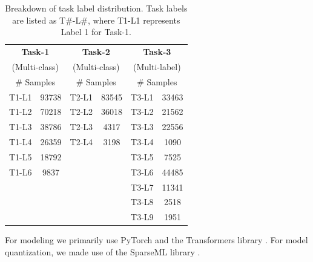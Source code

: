 \begin{table}[h]
    \centering
    \begin{center}
    \begin{tabular}{ l|ll|ll|l }
        \hline
        \multicolumn{2}{c}{\textbf{Task-1}} & \multicolumn{2}{||c||}{\textbf{Task-2}} & \multicolumn{2}{c}{\textbf{Task-3}} \\
        \multicolumn{2}{c}{(Multi-class)} & \multicolumn{2}{||c||}{(Multi-class)} & \multicolumn{2}{c}{(Multi-label)} \\
        \hline
        \multicolumn{2}{c}{\# Samples} & \multicolumn{2}{||c||}{\# Samples} & \multicolumn{2}{c}{\# Samples} \\
        \hline
        \multicolumn{1}{c}{T1-L1} & \multicolumn{1}{|c}{93738} & \multicolumn{1}{||c|}{T2-L1} & \multicolumn{1}{c||}{83545} & \multicolumn{1}{c|}{T3-L1} & \multicolumn{1}{c}{33463} \\
        \multicolumn{1}{c}{T1-L2} & \multicolumn{1}{|c}{70218} & \multicolumn{1}{||c|}{T2-L2} & \multicolumn{1}{c||}{36018} & \multicolumn{1}{c|}{T3-L2} & \multicolumn{1}{c}{21562} \\
        \multicolumn{1}{c}{T1-L3} & \multicolumn{1}{|c}{38786} & \multicolumn{1}{||c|}{T2-L3} & \multicolumn{1}{c||}{4317} & \multicolumn{1}{c|}{T3-L3} & \multicolumn{1}{c}{22556} \\
        \multicolumn{1}{c}{T1-L4} & \multicolumn{1}{|c}{26359} & \multicolumn{1}{||c|}{T2-L4} & \multicolumn{1}{c||}{3198} & \multicolumn{1}{c|}{T3-L4} & \multicolumn{1}{c}{1090} \\
        \multicolumn{1}{c}{T1-L5} & \multicolumn{1}{|c}{18792} & \multicolumn{1}{||c|}{} & \multicolumn{1}{c||}{} & \multicolumn{1}{c|}{T3-L5} & \multicolumn{1}{c}{7525} \\
        \multicolumn{1}{c}{T1-L6} & \multicolumn{1}{|c}{9837} & \multicolumn{1}{||c|}{} & \multicolumn{1}{c||}{} & \multicolumn{1}{c|}{T3-L6} & \multicolumn{1}{c}{44485} \\
        \multicolumn{1}{c}{} & \multicolumn{1}{|c}{} & \multicolumn{1}{||c|}{} & \multicolumn{1}{c||}{} & \multicolumn{1}{c|}{T3-L7} & \multicolumn{1}{c}{11341} \\
        \multicolumn{1}{c}{} & \multicolumn{1}{|c}{} & \multicolumn{1}{||c|}{} & \multicolumn{1}{c||}{} & \multicolumn{1}{c|}{T3-L8} & \multicolumn{1}{c}{2518} \\
        \multicolumn{1}{c}{} & \multicolumn{1}{|c}{} & \multicolumn{1}{||c|}{} & \multicolumn{1}{c||}{} & \multicolumn{1}{c|}{T3-L9} & \multicolumn{1}{c}{1951} \\
        \hline
    \end{tabular}
    \end{center}
    \caption{Breakdown of task label distribution. Task labels are listed as T\#-L\#, where T1-L1 represents Label 1 for Task-1.}
    \label{table_dataset_breakdown}
\end{table}
For modeling we primarily use PyTorch \cite{NEURIPS2019_9015} and the Transformers library \cite{wolf2019huggingface}.
For model quantization, we made use of the SparseML library \cite{pmlr-v119-kurtz20a, singh2020woodfisher}.

